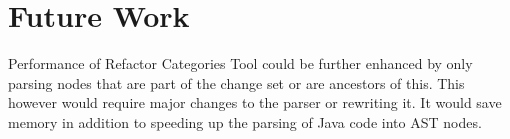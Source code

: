 
\chapter{Future Work}

Performance of Refactor Categories Tool could be further enhanced by only parsing nodes that are part of the change set or are ancestors of this.  This however would require major changes to the parser or rewriting it. It would save memory in addition to speeding up the parsing of Java code into AST nodes.



% 
% 
% 
% 
% 
% 






